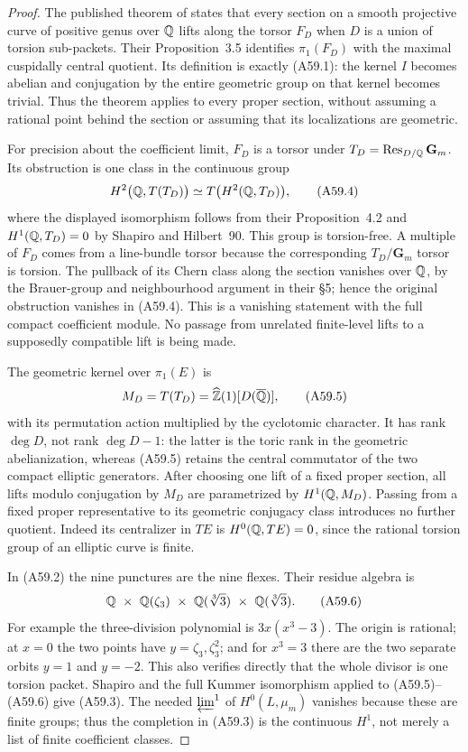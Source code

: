 \begin{proof}
The published theorem of \citet[Theorem~5.10]{AMBES2015} states that
every section on a smooth projective curve of positive genus over
$\mathbb Q$ lifts along the torsor $F_D$ when $D$ is a union of torsion
sub-packets. Their Proposition~3.5 identifies
$\pi_1(F_D)$ with the maximal cuspidally central quotient. Its
definition is exactly (A59.1): the kernel $I$ becomes abelian and
conjugation by the entire geometric group on that kernel becomes
trivial. Thus the theorem applies to every proper section, without
assuming a rational point behind the section or assuming that its
localizations are geometric.

For precision about the coefficient limit, $F_D$ is a torsor under
$T_D=\operatorname{Res}_{D/\mathbb Q}\mathbf G_m$. Its obstruction is one
class in the continuous group
\[
 H^2\bigl(\mathbb Q,T(T_D)\bigr)
   \simeq T\bigl(H^2(\mathbb Q,T_D)\bigr),
 \tag{A59.4}
\]
where the displayed isomorphism follows from their Proposition~4.2
and $H^1(\mathbb Q,T_D)=0$ by Shapiro and Hilbert~90. This group is
torsion-free. A multiple of $F_D$ comes from a line-bundle torsor
because the corresponding $T_D/\mathbf G_m$ torsor is torsion.
The pullback of its Chern class along the section vanishes over
$\mathbb Q$, by the Brauer-group and neighbourhood argument in their
\S5; hence the original obstruction vanishes in (A59.4).
This is a vanishing statement with the full compact coefficient
module. No passage from unrelated finite-level lifts to a supposedly
compatible lift is being made.

The geometric kernel over $\pi_1(E)$ is
\[
 M_D=T(T_D)=\widehat{\mathbb Z}(1)[D(\overline{\mathbb Q})],
 \tag{A59.5}
\]
with its permutation action multiplied by the cyclotomic character.
It has rank $\deg D$, not rank $\deg D-1$: the latter is the toric
rank in the geometric abelianization, whereas (A59.5) retains the
central commutator of the two compact elliptic generators.
After choosing one lift of a fixed proper section, all lifts modulo
conjugation by $M_D$ are parametrized by $H^1(\mathbb Q,M_D)$. Passing from
a fixed proper representative to its geometric conjugacy class
introduces no further quotient. Indeed its centralizer in $T E$ is
$H^0(\mathbb Q,T E)=0$, since the rational torsion group of an elliptic
curve is finite.

In (A59.2) the nine punctures are the nine flexes. Their residue
algebra is
\[
 \mathbb Q\ \times\ \mathbb Q(\zeta_3)\ \times\
 \mathbb Q(\sqrt[3]{3})\ \times\ \mathbb Q(\sqrt[3]{3}).
 \tag{A59.6}
\]
For example the three-division polynomial is $3x(x^3-3)$.
The origin is rational; at $x=0$ the two points have
$y=\zeta_3,\zeta_3^2$; and for $x^3=3$ there are the two separate
orbits $y=1$ and $y=-2$. This also verifies directly that the whole
divisor is one torsion packet. Shapiro and the full Kummer
isomorphism applied to (A59.5)--(A59.6) give (A59.3). The needed
$\varprojlim^1$ of $H^0(L,\mu_m)$ vanishes because these are finite
groups; thus the completion in (A59.3) is the continuous $H^1$,
not merely a list of finite coefficient classes.


\end{proof}
